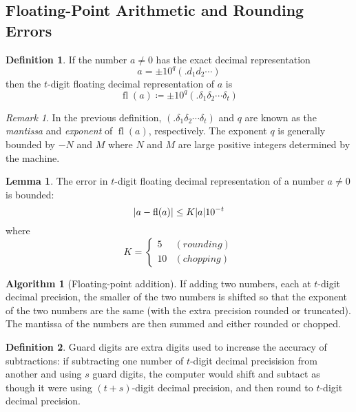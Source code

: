\documentclass[11pt,letterpaper]{article}
\numberwithin{figure}{section} %
\newcommand{\keyword}[1]{\colorbox{cyan!20!}{#1}}
\DeclareMathOperator{\fl}{fl}
\theoremstyle{definition}
\theoremstyle{definition}
\theoremstyle{definition}
\newtheorem{lemma}{Lemma}[subsection]
\theoremstyle{definition}
\newtheorem{definition}{Definition}[subsection]
\theoremstyle{definition}
\theoremstyle{remark}
\newtheorem*{remark}{Remark}
\theoremstyle{remark}
\theoremstyle{definition}
\newtheorem*{algorithm}{Algorithm}
\theoremstyle{remark}
\theoremstyle{remark}
\begin{document}
\begin{multicols*}{3}
\subsection{Floating-Point Arithmetic and Rounding Errors}
\begin{definition}
	If the number $a \neq 0$ has the exact decimal representation
	\[
		a = \pm 10^q(.d_1 d_2 \cdots)
	\]
	then the \keyword{$t$-digit floating decimal representation} of $a$ is 
	\[
		\fl(a) \coloneqq \pm 10^q(.\delta_1 \delta_2 \cdots \delta_t)
	\]
\end{definition}
\begin{remark}
	In the previous definition, $(.\delta_1 \delta_2 \cdots \delta_t)$ and $q$
	are known as the \textit{mantissa} and \textit{exponent} of $\fl(a)$,
	respectively. The exponent $q$ is generally bounded by $-N$ and $M$ where
	$N$ and $M$ are large positive integers determined by the machine.
\end{remark}
\begin{lemma}
	The error in $t$-digit floating decimal representation of a number $a\neq 0$
	is bounded:
	\[
		\abs{a - \fl(a)} \leq K \abs{a} 10^{-t}
	\]
	where
	\[
		K = 
		\begin{cases*}
			5 & (rounding) \\
			10 & (chopping)
		\end{cases*}
	\]
\end{lemma}
\begin{algorithm}[Floating-point addition]
	If adding two numbers, each at $t$-digit decimal precision, the smaller of
	the two numbers is shifted so that the exponent of the two numbers are the
	same (with the extra precision rounded or truncated). The
	mantissa of the numbers are then summed and either rounded or chopped.
\end{algorithm}
\begin{definition}
	\keyword{Guard digits} are extra digits used to increase the accuracy of
	subtractions: if subtracting one number of $t$-digit decimal precisision from
	another and using $s$ guard digits, the computer would shift and subtact as
	though it were using $(t+s)$-digit decimal precision, and then round to
	$t$-digit decimal precision.
\end{definition}

\end{multicols*}
\end{document}
